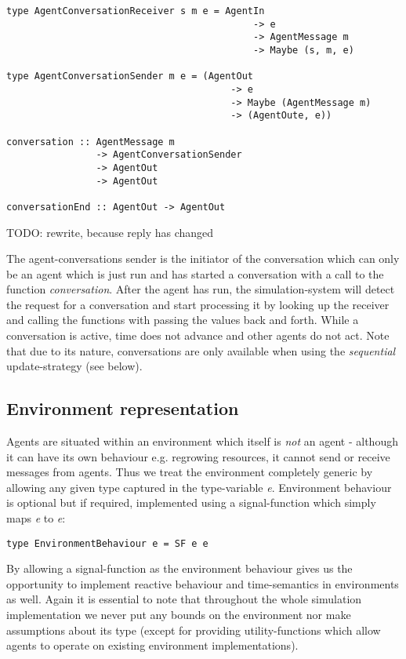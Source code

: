 \begin{verbatim}
type AgentConversationReceiver s m e = AgentIn
                                            -> e
                                            -> AgentMessage m
                                            -> Maybe (s, m, e)

type AgentConversationSender m e = (AgentOut
                                        -> e
                                        -> Maybe (AgentMessage m)  
                                        -> (AgentOute, e))
                                        
conversation :: AgentMessage m
                -> AgentConversationSender
                -> AgentOut
                -> AgentOut

conversationEnd :: AgentOut -> AgentOut 
\end{verbatim}

TODO: rewrite, because reply has changed 

The agent-conversations sender is the initiator of the conversation which can only be an agent which is just run and has started a conversation with a call to the function \textit{conversation}. After the agent has run, the simulation-system will detect the request for a conversation and start processing it by looking up the receiver and calling the functions with passing the values back and forth. While a conversation is active, time does not advance and other agents do not act. Note that due to its nature, conversations are only available when using the \textit{sequential} update-strategy (see below).

\subsection{Environment representation}
Agents are situated within an environment which itself is \textit{not} an agent - although it can have its own behaviour e.g. regrowing resources, it cannot send or receive messages from agents. Thus we treat the environment completely generic by allowing any given type captured in the type-variable \textit{e}. Environment behaviour is optional but if required, implemented using a signal-function which simply maps \textit{e} to \textit{e}:

\begin{verbatim}
type EnvironmentBehaviour e = SF e e
\end{verbatim}

By allowing a signal-function as the environment behaviour gives us the opportunity to implement reactive behaviour and time-semantics in environments as well. Again it is essential to note that throughout the whole simulation implementation we never put any bounds on the environment nor make assumptions about its type (except for providing utility-functions which allow agents to operate on existing environment implementations).

